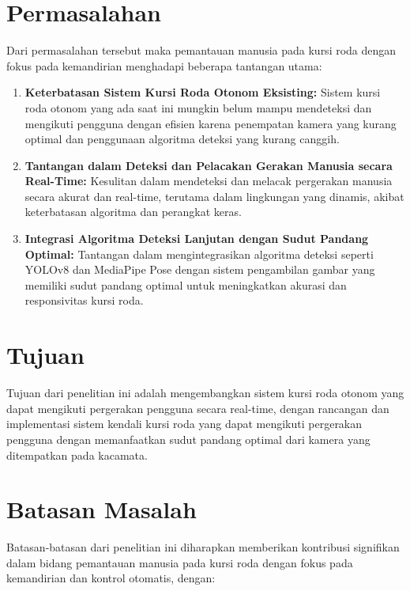 \section{Permasalahan}
\label{sec:permasalahan}

Dari permasalahan tersebut maka pemantauan manusia pada kursi roda dengan fokus pada kemandirian menghadapi beberapa tantangan utama:

\begin{enumerate}[nolistsep]
      \item \textbf{Keterbatasan Sistem Kursi Roda Otonom Eksisting:} Sistem kursi roda otonom yang ada saat ini mungkin belum mampu mendeteksi dan mengikuti pengguna dengan efisien karena penempatan kamera yang kurang optimal dan penggunaan algoritma deteksi yang kurang canggih.
      \item \textbf{Tantangan dalam Deteksi dan Pelacakan Gerakan Manusia secara Real-Time:} Kesulitan dalam mendeteksi dan melacak pergerakan manusia secara akurat dan real-time, terutama dalam lingkungan yang dinamis, akibat keterbatasan algoritma dan perangkat keras.
      \item \textbf{Integrasi Algoritma Deteksi Lanjutan dengan Sudut Pandang Optimal:} Tantangan dalam mengintegrasikan algoritma deteksi seperti YOLOv8 dan MediaPipe Pose dengan sistem pengambilan gambar yang memiliki sudut pandang optimal untuk meningkatkan akurasi dan responsivitas kursi roda.
\end{enumerate}

\section{Tujuan}
\label{sec:Tujuan}

Tujuan dari penelitian ini adalah mengembangkan sistem kursi roda otonom yang dapat mengikuti pergerakan pengguna secara real-time, dengan rancangan dan implementasi sistem kendali kursi roda yang dapat mengikuti pergerakan pengguna dengan memanfaatkan sudut pandang optimal dari kamera yang ditempatkan pada kacamata.

\section{Batasan Masalah}
\label{sec:batasanmasalah}

Batasan-batasan dari penelitian ini diharapkan memberikan kontribusi signifikan dalam bidang pemantauan manusia pada kursi roda dengan fokus pada kemandirian dan kontrol otomatis, dengan:

